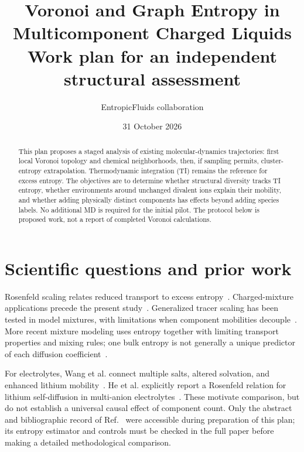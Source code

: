 \documentclass[11pt,a4paper]{article}
\title{Voronoi and Graph Entropy in Multicomponent Charged Liquids\\
\large Work plan for an independent structural assessment}
\author{EntropicFluids collaboration}
\date{31 October 2026}
\begin{document}
\maketitle
\begin{abstract}
This plan proposes a staged analysis of existing molecular-dynamics trajectories:
first local Voronoi topology and chemical neighborhoods, then, if sampling permits,
cluster-entropy extrapolation. Thermodynamic integration (TI) remains the reference
for excess entropy. The objectives are to determine whether structural diversity
tracks TI entropy, whether environments around unchanged divalent ions explain
their mobility, and whether adding physically distinct components has effects
beyond adding species labels. No additional MD is required for the initial pilot.
The protocol below is proposed work, not a report of completed Voronoi calculations.
\end{abstract}

\section{Scientific questions and prior work}
Rosenfeld scaling relates reduced transport to excess entropy~\cite{Rosenfeld1977}.
Charged-mixture applications precede the present study~\cite{Rosenfeld1995}.
Generalized tracer scaling has been tested in model mixtures, with limitations
when component mobilities decouple~\cite{Krekelberg2009}. More recent mixture
modeling uses entropy together with limiting transport properties and mixing
rules; one bulk entropy is not generally a unique predictor of each diffusion
coefficient~\cite{Schmitt2025}.

For electrolytes, Wang et al. connect multiple salts, altered solvation, and
enhanced lithium mobility~\cite{Wang2023}. He et al. explicitly report a
Rosenfeld relation for lithium self-diffusion in multi-anion
electrolytes~\cite{He2026}. These motivate comparison, but do not establish a
universal causal effect of component count. Only the abstract and bibliographic
record of Ref.~\cite{He2026} were accessible during preparation of this plan;
its entropy estimator and controls must be checked in the full paper before
making a detailed methodological comparison.
\end{document}

